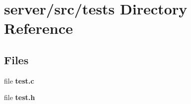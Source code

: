 \section{server/src/tests Directory Reference}
\label{dir_8dbb25af29c957154f08a56a9c6e06fa}
\subsection*{Files}
\begin{DoxyCompactItemize}
\item 
file {\bf test.\-c}
\item 
file {\bf test.\-h}
\end{DoxyCompactItemize}
